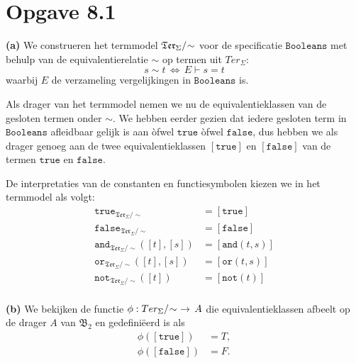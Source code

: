 \documentclass[a4paper,11pt]{article}
\begin{document}
\section*{Opgave 8.1}

\begin{description}

\item{\bf (a)} %
We construeren het termmodel $\mathfrak{Ter}_{\Sigma}/\negmedspace\sim$ voor de
specificatie $\texttt{Booleans}$ met behulp van de equivalentierelatie $\sim$
op termen uit $Ter_{\Sigma}$:
\begin{displaymath}
s \sim t \, \Longleftrightarrow \, E \vdash s = t
\end{displaymath}
waarbij $E$ de verzameling vergelijkingen in $\texttt{Booleans}$ is.

Als drager van het termmodel nemen we nu de equivalentieklassen van de
gesloten termen onder $\sim$. We hebben eerder gezien dat iedere gesloten term
in $\texttt{Booleans}$ afleidbaar gelijk is aan \`ofwel $\texttt{true}$
\`ofwel $\texttt{false}$, dus hebben we als drager genoeg aan de twee
equivalentieklassen $[\texttt{true}]$ en $[\texttt{false}]$ van de termen
$\texttt{true}$ en $\texttt{false}$.

De interpretaties van de constanten en functiesymbolen kiezen we in het
termmodel als volgt:
\begin{align*}
\texttt{true}_{\mathfrak{Ter}_{\Sigma}/\sim}         &= [\texttt{true}] \\
\texttt{false}_{\mathfrak{Ter}_{\Sigma}/\sim}        &= [\texttt{false}] \\
\texttt{and}_{\mathfrak{Ter}_{\Sigma}/\sim}([t],[s]) &= [\texttt{and}(t,s)] \\
\texttt{or}_{\mathfrak{Ter}_{\Sigma}/\sim}([t],[s])  &= [\texttt{or}(t,s)] \\
\texttt{not}_{\mathfrak{Ter}_{\Sigma}/\sim}([t])     &= [\texttt{not}(t)] \\
\end{align*}

\item{\bf (b)} %
We bekijken de functie $\phi : Ter_{\Sigma}/\negmedspace\sim \,\,
\rightarrow \, A$ die equivalentieklassen afbeelt op de drager $A$ van
$\mathfrak{B}_{2}$ en gedefini\"eerd is als
\begin{align*}
\phi([\texttt{true}])  &= T, \\
\phi([\texttt{false}]) &= F.
\end{align*}


\end{description}
\end{document}
